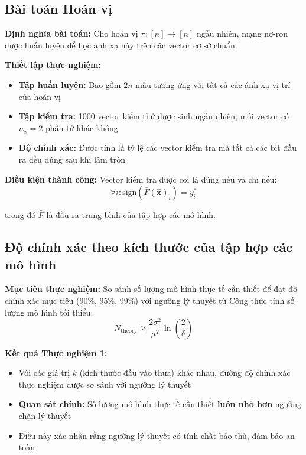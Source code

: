 \subsection{Bài toán Hoán vị}

\textbf{Định nghĩa bài toán:}
Cho hoán vị $\pi: [n] \rightarrow [n]$ ngẫu nhiên, mạng nơ-ron được huấn luyện để học ánh xạ này trên các vector cơ sở chuẩn.

\vspace{0.2cm}

\textbf{Thiết lập thực nghiệm:}
\begin{itemize}
    \item \textbf{Tập huấn luyện:} Bao gồm $2n$ mẫu tương ứng với tất cả các ánh xạ vị trí của hoán vị
    \item \textbf{Tập kiểm tra:} 1000 vector kiểm thử được sinh ngẫu nhiên, mỗi vector có $n_{\hat{x}} = 2$ phần tử khác không
    \item \textbf{Độ chính xác:} Được tính là tỷ lệ các vector kiểm tra mà tất cả các bit đầu ra đều đúng sau khi làm tròn
\end{itemize}

\textbf{Điều kiện thành công:}
Vector kiểm tra được coi là đúng nếu và chỉ nếu:
\begin{equation}
    \forall i: \text{sign}(\bar{F}(\hat{\mathbf{x}})_i) = y_i^*
\end{equation}

trong đó $\bar{F}$ là đầu ra trung bình của tập hợp các mô hình.

\subsection{Độ chính xác theo kích thước của tập hợp các mô hình}

\textbf{Mục tiêu thực nghiệm:}
So sánh số lượng mô hình thực tế cần thiết để đạt độ chính xác mục tiêu (90\%, 95\%, 99\%) với ngưỡng lý thuyết từ Công thức tính số lượng mô hình tối thiểu:
\begin{equation}
    N_{\text{theory}} \geq \frac{2\sigma^2}{\mu^2} \ln\left(\frac{2}{\delta}\right)
\end{equation}

\textbf{Kết quả Thực nghiệm 1:}
\begin{itemize}
    \item Với các giá trị $k$ (kích thước đầu vào thưa) khác nhau, đường độ chính xác thực nghiệm được so sánh với ngưỡng lý thuyết
    \item \textbf{Quan sát chính:} Số lượng mô hình thực tế cần thiết \textbf{luôn nhỏ hơn} ngưỡng chặn lý thuyết
    \item Điều này xác nhận rằng ngưỡng lý thuyết có tính chất bảo thủ, đảm bảo an toàn
\end{itemize}

